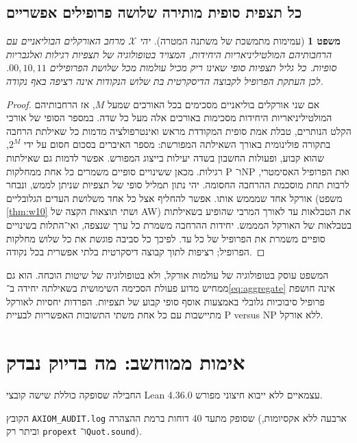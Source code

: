 \documentclass[11pt,a4paper]{article}
\newtheorem{theorem}{משפט}[section]
\theoremstyle{definition}
\theoremstyle{remark}
\newcommand{\EN}[1]{\textenglish{#1}}
\begin{document}
\subsection{כל תצפית סופית מותירה שלושה פרופילים אפשריים}
\begin{theorem}[עמימות מתמשכת של משתנה המטרה]\label{thm:top}
יהי $\mathcal X$ מרחב האורקלים הבוליאניים עם הרחבותיהם המולטיליניאריות היחידות, המצויד בטופולוגיה של תצפיות רגילות ואלגבריות סופיות. כל גליל תצפיות סופי שאינו ריק מכיל עולמות מכל שלושת הפרופילים $00,10,11$. לכן העתקת הפרופיל לקבוצה הדיסקרטית בת שלוש הנקודות אינה רציפה באף נקודה.
\end{theorem}
\begin{proof}
אם שני אורקלים בוליאניים מסכימים בכל האורכים שמעל $M$, אז הרחבותיהם המולטיליניאריות היחידות מסכימות באורכים אלה מעל כל שדה. במספר הסופי של אורכי הקלט הנותרים, טבלת אמת סופית המקודדת מראש ואינטרפולציה מדמות כל שאילתת הרחבה בתקורה פולינומית באורך השאילתה המפורשת: מספר האיברים בסכום חסום על ידי $2^M$, שהוא קבוע, ופעולות החשבון בשדה יעילות בייצוג המפורש. אפשר לדמות גם שאילתות רגילות. מכאן ששינויים סופיים משמרים כל אחת ממחלקות \EN{P} ו־\EN{NP} ואת הפרופיל האסימטרי, לרבות תחת מוסכמת ההרחבה החסומה. יהי נתון תמליל סופי של תצפיות שניתן לממש, ונבחר אורקל אחד שמממש אותו. אפשר להחליף אצל כל אחד משלושת העדים הגלובליים (משפט \ref{thm:w10} ושתי תוצאות הקצה של \EN{AW}) את הטבלאות עד לאורך המרבי שהופיע בשאילתות בטבלאות של האורקל המממש. יחידות ההרחבה משמרת כל ערך שנצפה, ואי־התלות בשינויים סופיים משמרת את הפרופיל של כל עד. לפיכך כל סביבה פוגשת את כל שלוש מחלקות הפרופיל; רציפות לתוך קבוצה דיסקרטית בלתי אפשרית בכל נקודה.
\end{proof}
המשפט עוסק בטופולוגיה של עולמות אורקל, ולא בטופולוגיה של שיטות הוכחה. הוא גם ממחיש מדוע פעולת הסכימה השימושית בשאילתה יחידה ב־\eqref{eq:aggregate} אינה חושפת פרופיל סיבוכיות גלובלי באמצעות אוסף סופי קבוע של תצפיות. הפרדות יחסיות לאורקל מתיישבות עם כל אחת משתי התשובות האפשריות לבעיית \EN{P versus NP} ללא אורקל.

\section{אימות ממוחשב: מה בדיוק נבדק}
החבילה שסופקה כוללת שישה קובצי \EN{Lean 4.36.0} עצמאיים ללא ייבוא חיצוני מפורש.

הקובץ \EN{\texttt{AXIOM\_AUDIT.log}} שסופק מתעד 40 דוחות ברמת ההצהרה (ארבעה ללא אקסיומות, וביתר רק \EN{\texttt{propext}} ו־\EN{\texttt{Quot.sound}}).
\end{document}
